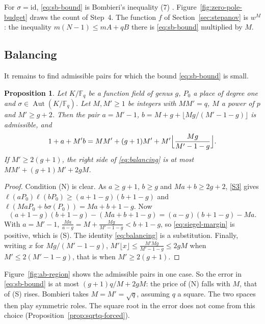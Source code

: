 \documentclass[11pt]{amsbook}
\theoremstyle{plain}
\newtheorem{proposition}[theorem]{Proposition}
\theoremstyle{definition}
\theoremstyle{remark}
\numberwithin{equation}{section}
\numberwithin{figure}{chapter}
\numberwithin{table}{chapter}
\newcommand{\F}{\mathbb{F}}
\DeclareMathOperator{\Aut}{Aut}
\begin{document}
For $\sigma=\mathrm{id}$, \eqref{eq:sb-bound} is Bombieri's
inequality (7) \cite[p.~238]{Bombieri1974}.
Figure~\ref{fig:zero-pole-budget} draws the count of Step~4. The
function $f$ of Section~\ref{sec:stepanov} is $w^M$: the inequality
$m(N-1)\le mA+qB$ there is \eqref{eq:sb-bound} multiplied by $M$.

\subsection{Balancing}

It remains to find admissible pairs for which the bound
\eqref{eq:sb-bound} is small.

\begin{proposition}\label{prop:balancing}
Let $K/\F_q$ be a function field of genus $g$, $P_0$ a place of
degree one and $\sigma\in\Aut(K/\F_q)$. Let $M,M'\ge1$ be integers
with $MM'=q$, $M$ a power of $p$ and $M'\ge g+2$. Then the pair
$a=M'-1$, $b=M+g+\lfloor Mg/(M'-1-g)\rfloor$ is admissible, and
\begin{equation}\label{eq:balancing}
1+a+M'b=MM'+(g+1)M'+M'\Bigl\lfloor\frac{Mg}{M'-1-g}\Bigr\rfloor.
\end{equation}
If $M'\ge2(g+1)$, the right side of \eqref{eq:balancing} is at most
$MM'+(g+1)M'+2gM$.
\end{proposition}

\begin{proof}
Condition (N) is clear. As $a\ge g+1$, $b\ge g$ and
$Ma+b\ge2g+2$, \ref{S3} gives
$\ell(aP_0)\ell(bP_0)\ge(a+1-g)(b+1-g)$ and
$\ell(MaP_0+b\sigma(P_0))=Ma+b+1-g$. Now
\begin{equation}\label{eq:siegel-margin}
(a+1-g)(b+1-g)-(Ma+b+1-g)=(a-g)(b+1-g)-Ma.
\end{equation}
With $a=M'-1$,
$\frac{Ma}{a-g}=M+\frac{Mg}{M'-1-g}<b+1-g$, so
\eqref{eq:siegel-margin} is positive, which is (S). The identity
\eqref{eq:balancing} is a substitution. Finally, writing $x$ for
$Mg/(M'-1-g)$,
$M'\lfloor x\rfloor\le\frac{M'Mg}{M'-1-g}\le2gM$ when
$M'\le2(M'-1-g)$, that is when $M'\ge2(g+1)$.
\end{proof}

Figure~\ref{fig:ab-region} shows the admissible pairs in one case.
So the error in \eqref{eq:sb-bound} is at most $(g+1)q/M+2gM$: the
price of (N) falls with $M$, that of (S) rises. Bombieri takes
$M=M'=\sqrt q$, assuming $q$ a square. The two spaces then play
symmetric roles. The square root in the error does not come from
this choice (Proposition~\ref{prop:sqrtq-forced}).
\ffabregion
\end{document}
